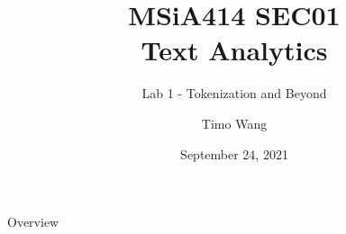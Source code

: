 \documentclass{beamer}
\begin{document}
\title{MSiA414 SEC01\\ Text Analytics}
\subtitle{Lab 1 - Tokenization and Beyond}
\author{Timo Wang}
\date{September 24, 2021}

\begin{frame}
    \titlepage
\end{frame}

\begin{frame}{Overview}
    \tableofcontents[hideallsubsections]
\end{frame}

\end{document}

